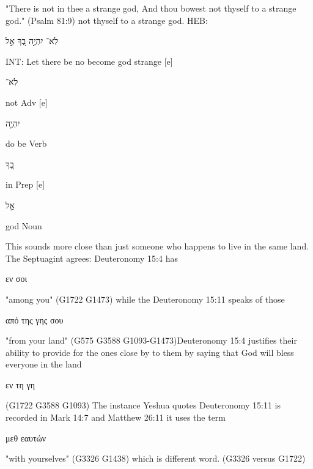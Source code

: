 \documentclass[11pt]{article}
\begin{document}
"There is not in thee a strange god, And thou bowest not thyself to a strange god."\newline
(Psalm 81:9) \newline
not thyself to a strange god.
HEB:\begin{hebrew} לֹֽא־ יִהְיֶ֣ה בְ֭ךָ אֵ֣ל \end{hebrew}\newline
INT: Let there be no become god strange [e]%
\begin{hebrew}	לֹֽא־	\end{hebrew}not	Adv [e]%
\begin{hebrew}	יִהְיֶ֣ה	\end{hebrew}do be	Verb\newline
\phantom{1961 [e]	}\begin{hebrew} בְ֭ךָ	\end{hebrew}in	Prep [e]%
\begin{hebrew}	אֵ֣ל \end{hebrew}	god	Noun\newline

This sounds more close than just someone who happens to live in the same land. The Septuagint agrees: Deuteronomy 15:4 has \begin{greek}εν σοι\end{greek}  "among you" (G1722 G1473) while the Deuteronomy 15:11 speaks of those \begin{greek} από της γης σου \end{greek} "from your land" (G575 G3588 G1093-G1473)\newline Deuteronomy 15:4 justifies their ability to provide for the ones close by to them by saying that God will bless everyone in the land \begin{greek}εν τη γη\end{greek} (G1722 G3588 G1093) The instance Yeshua quotes Deuteronomy 15:11 is recorded in Mark 14:7 and Matthew 26:11 it uses the term \begin{greek} μεθ εαυτών \end{greek} "with yourselves" (G3326 G1438) which is different word. (G3326 versus G1722)\newline
\end{document}
